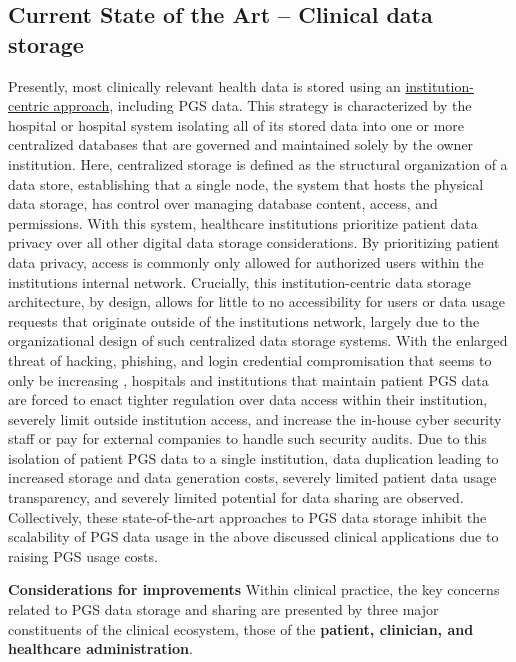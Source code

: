 \documentclass[a4paper,11pt]{article}
\begin{document}
\subsection{Current State of the Art -- Clinical data storage}
Presently, most clinically relevant health data is stored using an \underline{institution-centric approach}, including PGS data. 
This strategy is characterized by the hospital or hospital system isolating all of its stored data into one or more centralized databases that are governed and maintained solely by the owner institution. 
Here, centralized storage is defined as the structural organization of a data store, establishing that a single node, the system that hosts the physical data storage, has control over managing database content, access, and permissions. 
With this system, healthcare institutions prioritize patient data privacy over all other digital data storage considerations. 
By prioritizing patient data privacy, access is commonly only allowed for authorized users within the institution\textquotesingle s internal network. 
Crucially, this institution-centric data storage architecture, by design, allows for little to no accessibility for users or data usage requests that originate outside of the institution\textquotesingle s network, largely due to the organizational design of such centralized data storage systems. 
With the enlarged threat of hacking, phishing, and login credential compromisation that seems to only be increasing \cite{noauthor_ransomware_nodate}, hospitals and institutions that maintain patient PGS data are forced to enact tighter regulation over data access within their institution, severely limit outside institution access, and increase the in-house cyber security staff or pay for external companies to handle such security audits.  
Due to this isolation of patient PGS data to a single institution, data duplication leading to increased storage and data generation costs, severely limited patient data usage transparency, and severely limited potential for data sharing are observed. 
Collectively, these state-of-the-art approaches to PGS data storage inhibit the scalability of PGS data usage in the above discussed clinical applications due to raising PGS usage costs.


\textbf{Considerations for improvements}
Within clinical practice, the key concerns related to PGS data storage and sharing are presented by three major constituents of the clinical ecosystem, those of the \textbf{patient, clinician, and healthcare administration}. 
\end{document}
